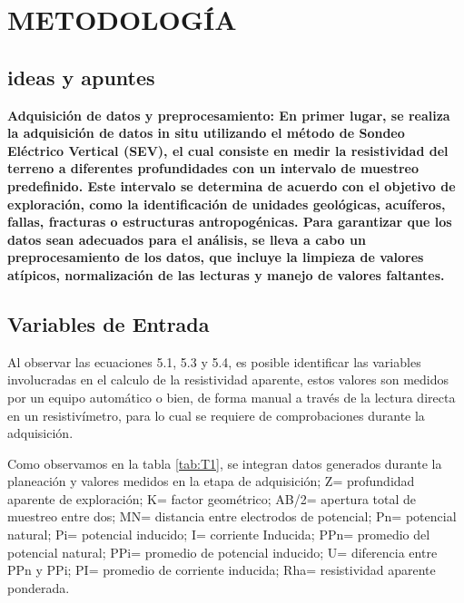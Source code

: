 \chapter{METODOLOGÍA}

\section{ideas y apuntes}


\textbf{Adquisición de datos y preprocesamiento: En primer lugar, se realiza la adquisición de datos in situ utilizando el método de Sondeo Eléctrico Vertical (SEV), el cual consiste en medir la resistividad del terreno a diferentes profundidades con un intervalo de muestreo predefinido. Este intervalo se determina de acuerdo con el objetivo de exploración, como la identificación de unidades geológicas, acuíferos, fallas, fracturas o estructuras antropogénicas. Para garantizar que los datos sean adecuados para el análisis, se lleva a cabo un preprocesamiento de los datos, que incluye la limpieza de valores atípicos, normalización de las lecturas y manejo de valores faltantes.}


\section{Variables de Entrada}
	Al observar las ecuaciones 5.1, 5.3 y 5.4, es posible identificar las variables involucradas en el calculo de la resistividad aparente, estos valores son medidos por un equipo automático o bien, de forma manual a través de la lectura directa en un resistivímetro, para lo cual se requiere de comprobaciones durante la adquisición.
		
	Como observamos en la tabla \ref{tab:T1}, se integran datos generados durante la planeación y valores medidos en la etapa de adquisición; Z= profundidad aparente de exploración; K= factor geométrico; AB/2= apertura total de muestreo entre dos;  MN= distancia entre electrodos de potencial; Pn= potencial natural; Pi= potencial inducido; I= corriente Inducida; PPn= promedio del potencial natural; PPi= promedio de potencial inducido; U= diferencia entre PPn y PPi; PI= promedio de corriente inducida; Rha= resistividad aparente ponderada.
	
	
	
